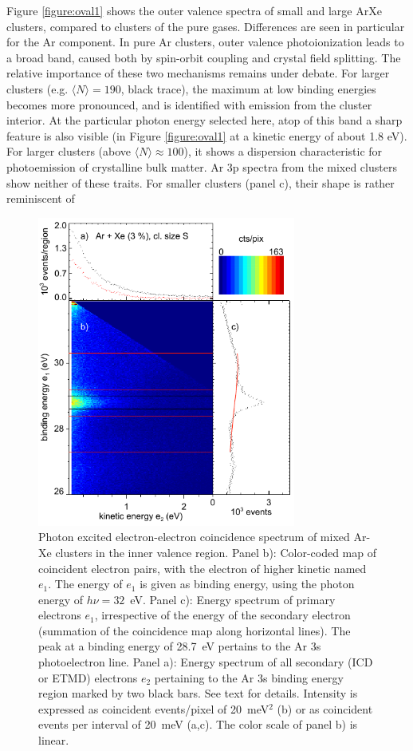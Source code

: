 Figure \ref{figure:oval1} shows the outer valence spectra of small and large ArXe clusters, compared to clusters of the pure gases. 
Differences are seen in particular for the Ar component. 
In pure Ar clusters, outer valence photoionization leads to a broad band, caused both by spin-orbit coupling and crystal field splitting. 
The relative importance of these two mechanisms remains under debate.\cite{hergenhahnprb,rolles} 
For larger clusters (e.g. $\langle N\rangle = 190$, black trace), the maximum at low binding energies becomes more pronounced, and is identified with emission from the cluster interior.\cite{hergenhahnprb,rolles}
At the particular photon energy selected here, atop of this band a sharp feature is also visible (in Figure \ref{figure:oval1} at a kinetic energy of about 1.8 eV). 
For larger clusters (above $\langle N\rangle \approx 100$), it shows a dispersion characteristic for photoemission of crystalline bulk matter.\cite{foerstel_arg1_2010,foerstel_arg2_2011} 
Ar 3p spectra from the mixed clusters show neither of these traits.
For smaller clusters (panel c), their shape is rather reminiscent of 


\begin{figure}[ht]
 \centering
 \includegraphics[width=8.5cm]{pics/figure_map.pdf}
 \caption{
Photon excited electron-electron coincidence spectrum of mixed Ar-Xe clusters in the inner valence region. Panel b): Color-coded map of coincident electron pairs, with the electron of higher kinetic named $e_1$. The energy of $e_1$ is given as binding energy, using the photon energy of $h\nu = 32$~eV. Panel c): Energy spectrum of primary electrons $e_1$, irrespective of the energy of the secondary electron (summation of the coincidence map along horizontal lines). The peak at a binding energy of 28.7~eV pertains to the Ar 3s photoelectron line.  Panel a): Energy spectrum of all secondary (ICD or ETMD) electrons $e_2$ pertaining to the Ar 3s binding energy region marked by two black bars. See text for details. Intensity is expressed as coincident events/pixel of 20~meV$^2$ (b) or as coincident events per interval of 20~meV (a,c). The color scale of panel b) is linear.
}
 \label{figure:map}
\end{figure}


